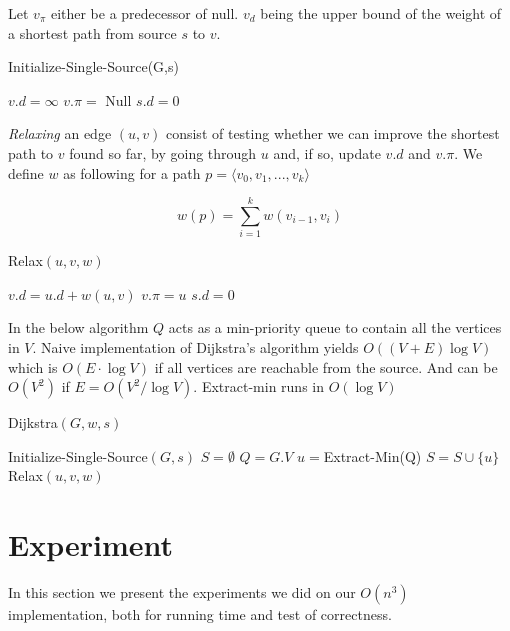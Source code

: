 Let $v_\pi$ either be a predecessor of null. $v_d$ being the upper bound of
the weight of a shortest path from source $s$ to $v$. 

\begin{algorithm} 
	\caption{Initialize-Single-Source(G,s)}
	\begin{algorithmic}[1] 
			\State $v.d = \infty$
			\State $v.\pi =$ Null
		\EndFor 
		\State $s.d = 0$ 
	\end{algorithmic} \end{algorithm}

	\emph{Relaxing} an edge $(u,v)$ consist of testing whether we can improve the shortest
path to $v$ found so far, by going through $u$ and, if so, update $v.d$ and
$v.\pi$. We define $w$ as following for a path $p=\langle v_0,v_1,...,v_k
\rangle$

$$ w(p) = \sum_{i=1}^k w(v_{i-1},v_i) $$

\begin{algorithm} 
	\caption{Relax$(u,v,w)$} 
	\begin{algorithmic}[1] 
			\State $v.d=u.d+w(u,v)$ 
			\State $v.\pi = u$ 
		\EndIf 
		\State $s.d = 0$
	\end{algorithmic} 
\end{algorithm}

In the below algorithm $Q$ acts as a min-priority queue to contain all the
	vertices in $V$. Naive implementation of Dijkstra's algorithm yields
	$O((V+E)\log V)$ which is $O(E \cdot \log V)$ if all vertices are reachable
	from the source. And can be $O(V^2)$ if $E=O(V^2/\log V)$. Extract-min runs
	in $O(\log V)$ 

\begin{algorithm}[H]
	\caption{Dijkstra$(G,w,s)$} 
	\begin{algorithmic}[1] 
		\State Initialize-Single-Source$(G,s)$
		\State $S = \emptyset$ 
		\State $Q = G.V$ 
			\State $u = $Extract-Min(Q) 
			\State $S = S \cup \{u\}$
				\State Relax$(u,v,w)$
			\EndFor 
		\EndWhile
	\end{algorithmic} 
\end{algorithm}

\section{Experiment}
In this section we present the experiments we did on our $O(n^3)$ implementation,
both for running time and test of correctness.

